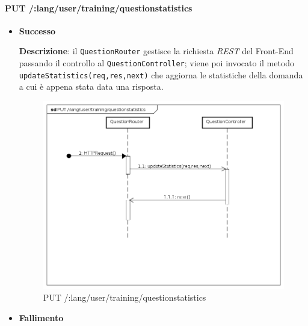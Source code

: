 \paragraph{PUT /:lang/user/training/questionstatistics} %
\begin{itemize}
\item \textbf{Successo}

\textbf{Descrizione}: il \texttt{QuestionRouter} gestisce la richiesta \textit{REST} del Front-End passando il controllo al \texttt{QuestionController}; viene poi invocato il metodo\\ \texttt{updateStatistics(req,res,next)} che aggiorna le statistiche della domanda a cui è appena stata data una risposta.

\begin{figure}[ht]
	\centering
	\includegraphics[scale=0.45]{UML/DiagrammiDiSequenza/Back-end/PUT__lang_user_training_questionstatistics.png}
	\caption{PUT /:lang/user/training/questionstatistics}
\end{figure}
\FloatBarrier

\item \textbf{Fallimento}
\end{itemize}  